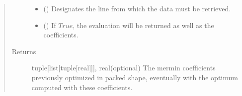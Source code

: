 \documentclass[letterpaper,10pt,english]{sphinxmanual}
\begin{document}
\begin{fulllineitems}
\begin{quote}
\begin{description}
\begin{itemize}
\item {} 
 () \textendash{} Designates the line from which the data must be
retrieved.

\item {} 
 () \textendash{} If \(True\), the evaluation will be returned as 
well as the coefficients.

\end{itemize}

\item[{Returns}] \leavevmode
tuple{[}list{[}tuple{[}real{]}{]}{]}, real(optional) \textendash{} The mermin coefficients 
previously optimized in packed shape, eventually with the optimum computed
with these coefficients.

\end{description}\end{quote}

\end{fulllineitems}

\end{document}

